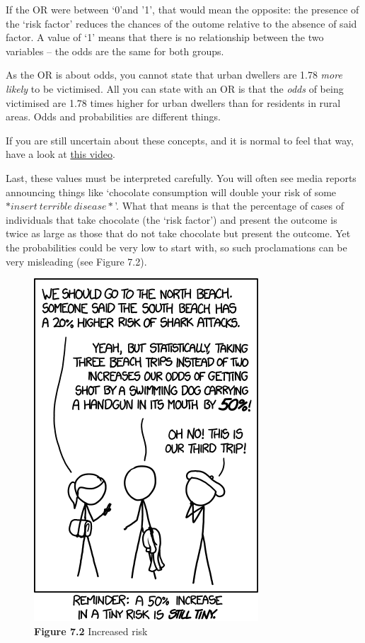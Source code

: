 \documentclass[
]{book}
\begin{document}
If the OR were between `0'and '1', that would mean the opposite: the presence of the `risk factor' reduces the chances of the outome relative to the absence of said factor.
A value of `1' means that there is no relationship between the two variables -- the odds are the same for both groups.

As the OR is about odds, you cannot state that urban dwellers are 1.78 \emph{more likely} to be victimised. All you can state with an OR is that the \emph{odds} of being victimised are 1.78 times higher for urban dwellers than for residents in rural areas. Odds and probabilities are different things.

If you are still uncertain about these concepts, and it is normal to feel that way, have a look at \href{https://www.youtube.com/watch?v=nFHL54yOniI}{this video}.

Last, these values must be interpreted carefully. You will often see media reports announcing things like `chocolate consumption will double your risk of some \(*insert~ terrible~ disease*\)'. What that means is that the percentage of cases of individuals that take chocolate (the `risk factor') and present the outcome is twice as large as those that do not take chocolate but present the outcome. Yet the probabilities could be very low to start with, so such proclamations can be very misleading (see Figure 7.2).

\begin{figure}
\centering
\includegraphics{Images/increased_risk.png}
\caption{\textbf{Figure 7.2} Increased risk}
\end{figure}
\end{document}
